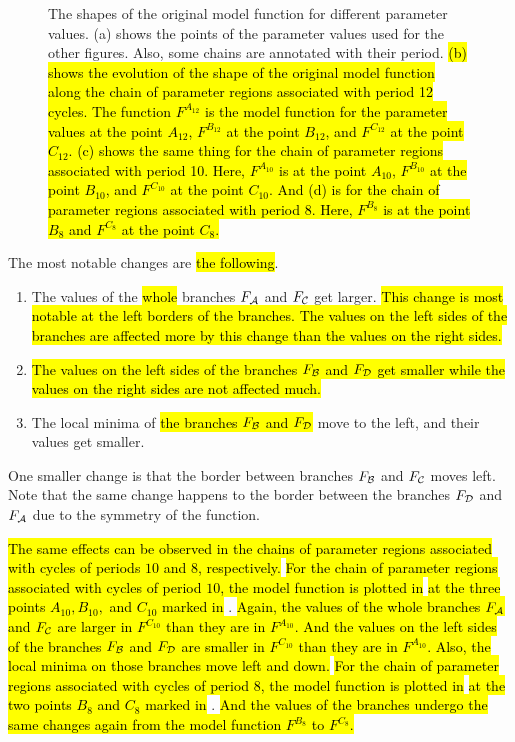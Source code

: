 \begin{figure}
{		\label{fig:setup.char.evolution.08}
	}
	\caption[Effects of parameters on the original model function]{
		The shapes of the original model function for different parameter values.
		(a) shows the points of the parameter values used for the other figures.
		Also, some chains are annotated with their period.
		\hl{
			(b) shows the evolution of the shape of the original model function along the chain of parameter regions associated with period 12 cycles.
			The function $F^{A_{12}}$ is the model function for the parameter values at the point $A_{12}$, $F^{B_{12}}$ at the point $B_{12}$, and $F^{C_{12}}$ at the point $C_{12}$.
			(c) shows the same thing for the chain of parameter regions associated with period 10.
			Here, $F^{A_{10}}$ is at the point $A_{10}$, $F^{B_{10}}$ at the point $B_{10}$, and $F^{C_{10}}$ at the point $C_{10}$.
			And (d) is for the chain of parameter regions associated with period 8.
			Here, $F^{B_8}$ is at the point $B_8$ and $F^{C_8}$ at the point $C_8$.
		}
	}
	\label{fig:setup.char.evolution.combined}
\end{figure}

The most notable changes are \hl{the following}.
\begin{enumerate}
	\item The values of the \hl{whole} branches $F_{\mathcal{A}}$ and $F_{\mathcal{C}}$ get larger.
	      \hl{
		      This change is most notable at the left borders of the branches.
		      The values on the left sides of the branches are affected more by this change than the values on the right sides.
	      }
	\item \hl{
		      The values on the left sides of the branches $F_{\mathcal{B}}$ and $F_{\mathcal{D}}$ get smaller while the values on the right sides are not affected much.
	      }
	\item The local minima of \hl{the branches $F_{\mathcal{B}}$ and $F_{\mathcal{D}}$} move to the left, and their values get smaller.
\end{enumerate}
One smaller change is that the border between branches $F_{\mathcal{B}}$ and $F_{\mathcal{C}}$ moves left.
Note that the same change happens to the border between the branches $F_{\mathcal{D}}$ and $F_{\mathcal{A}}$ due to the symmetry of the function.

\hl{
	The same effects can be observed in the chains of parameter regions associated with cycles of periods $10$ and $8$, respectively.
}
\hl{For the chain of parameter regions associated with cycles of period $10$, the model function is plotted in}  \hl{at the three points $A_{10}, B_{10},$ and $C_{10}$ marked in} .
\hl{
	Again, the values of the whole branches $F_{\mathcal{A}}$ and $F_{\mathcal{C}}$ are larger in $F^{C_{10}}$ than they are in $F^{A_{10}}$.
	And the values on the left sides of the branches $F_{\mathcal{B}}$ and $F_{\mathcal{D}}$ are smaller in $F^{C_{10}}$ than they are in $F^{A_{10}}$.
	Also, the local minima on those branches move left and down.
}
\hl{For the chain of parameter regions associated with cycles of period $8$, the model function is plotted in}  \hl{at the two points $B_8$ and $C_8$ marked in} .
\hl{
	And the values of the branches undergo the same changes again from the model function $F^{B_8}$ to $F^{C_8}$.
}

